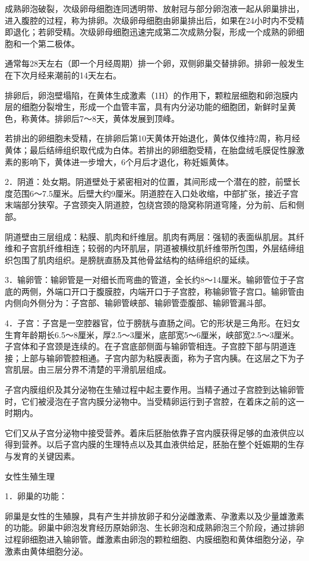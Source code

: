 \documentclass[12pt,UTF8,openany]{ctexbook}
\begin{document}
成熟卵泡破裂，次级卵母细胞连同透明带、放射冠与部分卵泡液一起从卵巢排出，进入腹腔的过程，称为排卵。次级卵母细胞由卵巢排出后，如果在24小时内不受精即退化；若卵受精。次级卵母细胞迅速完成第二次成熟分裂，形成一个成熟的卵细胞和一个第二极体。

通常每28天左右（即一个月经周期）排一个卵，双侧卵巢交替排卵。排卵一般发生在下次月经来潮前的14天左右。

排卵后，卵泡壁塌陷，在黄体生成激素（1H）的作用下，颗粒层细胞和卵泡膜内层的细胞分裂增生，形成一个血管丰富，具有内分泌功能的细胞团，新鲜时呈黄色，称黄体。排卵后7～8天，黄体发展到顶峰。

若排出的卵细胞未受精，在排卵后第10天黄体开始退化，黄体仅维持2周，称月经黄体；最后结缔组织取代成为白体。若排出的卵细胞受精，在胎盘绒毛膜促性腺激素的影响下，黄体进一步增大，6个月后才退化，称妊娠黄体。

2．阴道：处女期。阴道壁处于紧密相对的位置，其间形成一个潜在的腔，前壁长度范围6～7.5厘米。后壁大约9厘米。阴道腔在入口处收缩，中部扩张，接近子宫末端部分狭窄。子宫颈突入阴道腔，包绕宫颈的隐窝称阴道穹隆，分为前、后和侧部。

阴道壁由三层组成：粘膜、肌肉和纤维层。肌肉有两层：强韧的表面纵肌层。其纤维和子宫肌纤维相连；较弱的内环肌层，阴道被横纹肌纤维带所包围，外层结缔组织包围了肌肉组织。是膀胱直肠及其他骨盆结构的结缔组织的延续。

3．输卵管：输卵管是一对细长而弯曲的管道，全长约8～14厘米。输卵管位于子宫底的两侧，外端口开口于腹膜腔，内端开口于子宫腔，称输卵管子宫口。输卵管由内侧向外侧分为：子宫部、输卵管峡部、输卵管壶腹部、输卵管漏斗部。

4．子宫：子宫是一空腔器官，位于膀胱与直肠之间。它的形状是三角形。在妇女生育年龄期长6.5～8厘米，厚2.5～3厘米，底部宽5～6厘米，峡部宽2.5～3厘米。子宫体和子宫颈是连续的。在子宫底部侧面与输卵管相连。子宫腔下部与阴道连接；上部与输卵管腔相通。子宫内部为粘膜表面，称为子宫内胰。在这层之下为子宫肌层。由三层分界不清楚的平滑肌层组成。

子宫内膜组织及其分泌物在生殖过程中起主要作用。当精子通过子宫腔到达输卵管时，它们被浸泡在子宫内膜分泌物中。当受精卵运行到子宫腔，在着床之前的这一时期内。

它们又从子宫分泌物中接受营养。着床后胚胎依靠子宫内膜获得足够的血液供应以得到营养。以后子宫内膜的生理特点以及其血液供给足，胚胎在整个妊娠期的生存与发育的关键因素。

女性生殖生理

1．卵巢的功能：

卵巢是女性的生殖腺，具有产生并排放卵子和分泌雌激素、孕激素以及少量雄激素的功能。卵巢中卵泡发育经历原始卵泡、生长卵泡和成熟卵泡三个阶段，通过排卵过程卵细胞进入输卵管。雌激素由卵泡的颗粒细胞、内膜细胞和黄体细胞分泌，孕激素由黄体细胞分泌。
\end{document}
